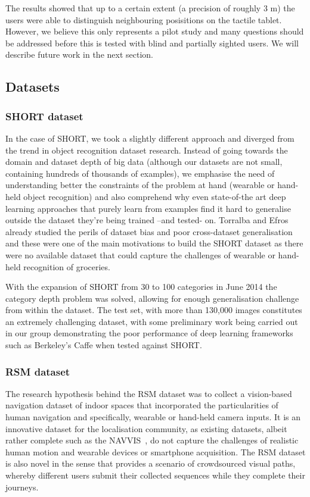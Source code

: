 The results showed that up to a certain extent (a precision of roughly 3 m) the users were able to distinguish neighbouring posisitions on the tactile tablet. However, we believe this only represents a pilot study and many questions should be addressed before this is tested with blind and partially sighted users. We will describe future work in the next section.

\subsection{Datasets}

\subsubsection{SHORT dataset}

In the case of SHORT, we took a slightly different approach and diverged from the trend in object recognition dataset research. Instead of going towards the domain and dataset depth of big data (although our datasets are not small, containing hundreds of thousands of examples), we emphasise the need of understanding better the constraints of the problem at hand (wearable or hand-held object recognition) and also comprehend why even state-of-the art deep learning approaches that purely learn from examples find it hard to generalise outside the dataset they're being trained --and tested- on. Torralba and Efros already studied the perils of dataset bias and poor cross-dataset generalisation \cite{torralba2011unbiased} and these were one of the main motivations to build the SHORT dataset as there were no available dataset that could capture the challenges of wearable or hand-held recognition of groceries.

With the expansion of SHORT from 30 to 100 categories in June 2014 the category depth problem was solved, allowing for enough generalisation challenge from within the dataset. The test set, with more than	 130,000 images constitutes an extremely challenging dataset, with some preliminary work  being carried out in our group demonstrating the poor performance of deep learning frameworks such as Berkeley's Caffe \cite{jia2014caffe} when tested against SHORT.

\subsubsection{RSM dataset}

The research hypothesis behind the RSM dataset was to collect a vision-based navigation dataset of indoor spaces that incorporated the particularities of human navigation and specifically, wearable or hand-held camera inputs. It is an innovative dataset for the localisation community, as existing datasets, albeit rather complete such as the NAVVIS~\cite{Huitl2012}, do not capture the challenges of realistic human motion and wearable devices or smartphone acquisition. The RSM dataset is also novel in the sense that provides a scenario of crowdsourced visual paths, whereby   different users submit their collected sequences while they complete their journeys. 

